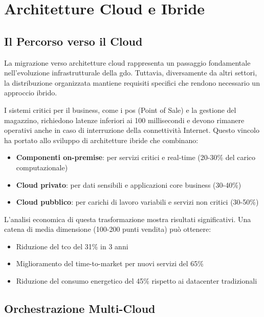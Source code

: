 \section{Architetture Cloud e Ibride}
\label{sec:cloud_architectures}

\subsection{Il Percorso verso il Cloud}
\label{subsec:cloud_journey}

La migrazione verso architetture cloud rappresenta un passaggio fondamentale nell'evoluzione infrastrutturale della \gls{gdo}. Tuttavia, diversamente da altri settori, la distribuzione organizzata mantiene requisiti specifici che rendono necessario un approccio ibrido\autocite{McKinsey2024}.

I sistemi critici per il business, come i \gls{pos} (Point of Sale) e la gestione del magazzino, richiedono latenze inferiori ai 100 millisecondi e devono rimanere operativi anche in caso di interruzione della connettività Internet. Questo vincolo ha portato allo sviluppo di architetture ibride che combinano:

\begin{itemize}
    \item \textbf{Componenti on-premise}: per servizi critici e real-time (20-30\% del carico computazionale)
    \item \textbf{Cloud privato}: per dati sensibili e applicazioni core business (30-40\%)
    \item \textbf{Cloud pubblico}: per carichi di lavoro variabili e servizi non critici (30-50\%)
\end{itemize}

L'analisi economica di questa trasformazione mostra risultati significativi. Una catena di media dimensione (100-200 punti vendita) può ottenere\autocite{Deloitte2024}:
\begin{itemize}
    \item Riduzione del \gls{tco} del 31\% in 3 anni
    \item Miglioramento del time-to-market per nuovi servizi del 65\%
    \item Riduzione del consumo energetico del 45\% rispetto ai datacenter tradizionali
\end{itemize}

\subsection{Orchestrazione Multi-Cloud}
\label{subsec:multicloud}

